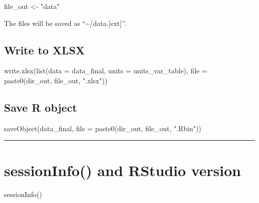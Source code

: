 \documentclass[
]{article}
\newenvironment{Shaded}{\begin{snugshade}}{\end{snugshade}}
\newcommand{\AttributeTok}[1]{\textcolor[rgb]{0.77,0.63,0.00}{#1}}
\newcommand{\FunctionTok}[1]{\textcolor[rgb]{0.00,0.00,0.00}{#1}}
\newcommand{\NormalTok}[1]{#1}
\newcommand{\OtherTok}[1]{\textcolor[rgb]{0.56,0.35,0.01}{#1}}
\newcommand{\StringTok}[1]{\textcolor[rgb]{0.31,0.60,0.02}{#1}}
\begin{document}
\begin{Shaded}
\begin{Highlighting}[]
\NormalTok{file\_out }\OtherTok{\textless{}{-}} \StringTok{"data"}
\end{Highlighting}
\end{Shaded}

The files will be saved as ``\textasciitilde/data.{[}ext{]}''.

\hypertarget{write-to-xlsx}{%
\subsection{Write to XLSX}\label{write-to-xlsx}}

\begin{Shaded}
\begin{Highlighting}[]
\FunctionTok{write.xlsx}\NormalTok{(}\FunctionTok{list}\NormalTok{(}\AttributeTok{data =}\NormalTok{ data\_final, }\AttributeTok{units =}\NormalTok{ units\_var\_table), }
           \AttributeTok{file =} \FunctionTok{paste0}\NormalTok{(dir\_out, file\_out, }\StringTok{".xlsx"}\NormalTok{))}
\end{Highlighting}
\end{Shaded}

\hypertarget{save-r-object}{%
\subsection{Save R object}\label{save-r-object}}

\begin{Shaded}
\begin{Highlighting}[]
\FunctionTok{saveObject}\NormalTok{(data\_final, }\AttributeTok{file =} \FunctionTok{paste0}\NormalTok{(dir\_out, file\_out, }\StringTok{".Rbin"}\NormalTok{))}
\end{Highlighting}
\end{Shaded}

\begin{center}\rule{0.5\linewidth}{0.5pt}\end{center}

\hypertarget{sessioninfo-and-rstudio-version}{%
\section{sessionInfo() and RStudio
version}\label{sessioninfo-and-rstudio-version}}

\begin{Shaded}
\begin{Highlighting}[]
\FunctionTok{sessionInfo}\NormalTok{()}
\end{Highlighting}
\end{Shaded}
\end{document}
